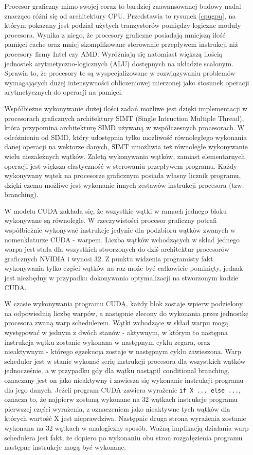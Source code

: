 Procesor graficzny mimo swojej coraz to bardziej zaawansowanej budowy nadal
znacząco różni się od architektury CPU. Przedstawia to rysunek \ref{cpugpu}, na
którym pokazany jest podział użytych tranzystorów pomiędzy logiczne moduły procesora.
Wynika z niego, że procesory graficzne posiadają mniejszą ilość pamięci cache oraz
mniej skomplikowane sterowanie przepływem instrukcji niż procesory firmy
Intel czy AMD. Wyróżniają się natomiast większą ilością jednostek arytmetyczno-logicznych
(ALU) dostępnych na układzie scalonym. Sprawia to, że procesory te są wyspecjalizowane w rozwiązywaniu
problemów wymagających dużej intensywności obliczeniowej mierzonej jako stosunek
operacji arytmetycznych do operacji na pamięci.

Współbieżne wykonywanie dużej ilości zadań możliwe jest dzięki implementacji
w procesorach graficznych architektury SIMT (Single Intruction Multiple Thread), która
przypomina architekturę SIMD używaną w współczesnych procesorach. W
odróżnieniu od SIMD, który udostępnia tylko możliwość równoległego wykonania danej
operacji na wektorze danych, SIMT umożliwia też równoległe wykonywanie wielu
niezależnych wątków. Zaletą wykonywania wątków, zamiast elementarnych operacji jest większa
elastyczność w sterowaniu przepływem programu. Każdy wykonywany wątek
na procesorze graficznym posiada własny licznik programu, dzięki czemu możliwe
jest wykonanie innych zestawów instrukcji procesora (tzw. branching).

W modelu CUDA zakłada się, że wszystkie wątki w ramach jednego bloku wykonywane
są równolegle. W rzeczywistości procesor graficzny potrafi współbieżnie wykonywać
instrukcje jedynie dla podzbioru wątków zwanych w nomenklaturze CUDA - warpem. 
Liczba wątków wchodzących w skład jednego warpa jest stała dla wszystkich stworzonych
do dziś architektur procesorów graficznych NVIDIA i wynosi 32. Z punktu
widzenia programisty fakt wykonywania tylko części wątków na raz może być
całkowicie pominięty, jednak jest niezbędny w przypadku dokonywania
optymalizacji na stworzonym kodzie CUDA\cite{kepler}.

W czasie wykonywania programu CUDA, każdy blok zostaje wpierw podzielony na odpowiednią
liczbę warpów, a następnie zlecony do wykonania przez jednostkę procesora zwaną warp
schedulerem. Wątki wchodzące w skład warpu mogą występować w jednym z dwóch stanów
- aktywnym, w którym to następna instrukcja wątku zostanie wykonana w następnym
cyklu zegara, oraz nieaktywnym - którego egzekucja zostaje w następnym cyklu
zawieszona. Warp scheduler jest w stanie wykonać serię instrukcji
procesora dla wszystkich wątków jednocześnie, a w przypadku gdy dla wątku
nastąpił conditional branching, oznaczany jest on jako nieaktywny i
zawiesza się wykonanie instrukcji programu dla jego danych. Jeżeli program CUDA
zawiera wyrażenie \texttt{if X {...} else {...}}, oznacza to, że najpierw zostaną
wykonane na 32 wątkach instrukcje programu pierwszej części wyrażenia,
		 z oznaczeniem jako nieaktywne tych wątków dla których wartość X jest
		 nieprawdziwa. Następnie druga strona wyrażenia zostanie wykonana na 32
		 wątkach w analogiczny sposób. Ważną implikacją działania warp
		 schedulera jest fakt, że dopiero po wykonaniu obu stron rozgałęzienia
		 programu następne instrukcje mogą być wykonane.


